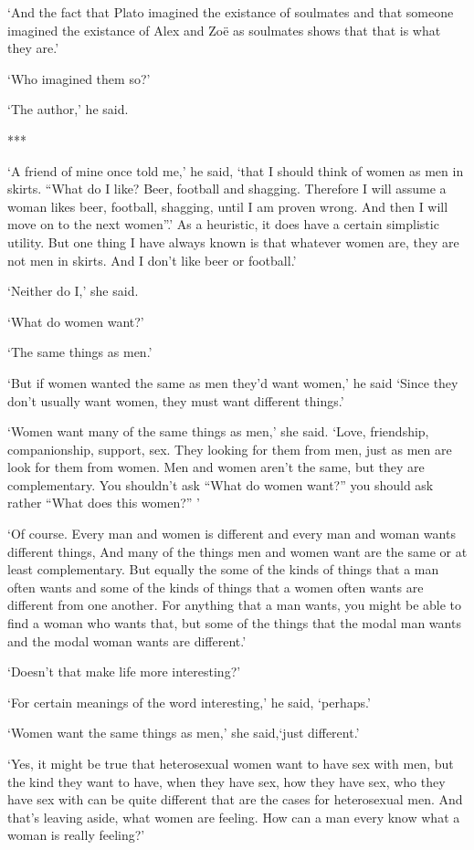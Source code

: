 `And the fact that Plato imagined the existance of soulmates and that someone imagined the existance of Alex and Zo{\"e} as soulmates shows that that is what they are.'

`Who imagined them so?'

`The author,' he said.

***

`A friend of mine once told me,' he said, `that I should think of women as men
in skirts. ``What do I like? Beer, football and shagging.
Therefore I will assume a woman likes beer, football, shagging,
until I am proven wrong. And then I will move on to the
next women''.' As a heuristic, it does have a certain simplistic utility. But one thing I have always known is that whatever
women are, they are not men in skirts. And I don't like beer or football.'

`Neither do I,' she said.

`What do women want?'

`The same things as men.'

`But if women wanted the same as men they'd want women,' he said `Since they
don't usually want women, they must want different things.'

`Women want many of the same things as men,' she said. `Love,
friendship, companionship, support, sex. They looking for
them from men, just as men are look for them from women. Men and
women aren't the same, but they are complementary. You
shouldn't ask ``What do women want?'' you should ask rather ``What
does {\twelveit this\/} women?'' '

`Of course. Every man and women is different and every man and woman
wants different things, And many of the things men and women want
are the same or at least complementary. But equally the some of the
kinds of things that a man often wants and some of the kinds of
things that a women often wants are different from one another. For
anything that a man wants, you might be able to find a woman who wants
that, but some of the things that the modal man wants and the modal
woman wants are different.'

`Doesn't that make life more interesting?'

`For certain meanings of the word {\twelveit interesting},' he said, `perhaps.'

`Women want the same things as men,' she said,`just different.'

`Yes, it might be true that heterosexual women want to have sex with
men, but the kind they want to have, when they have sex, how they
have sex, who they have sex with can be quite different that are the
cases for heterosexual men. And that's leaving aside, what women are
feeling. How can a man every know what a woman is really feeling?'

